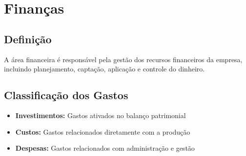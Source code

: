 \documentclass{article}
\begin{document}
\section{Finanças}

\subsection{Definição}
A área financeira é responsável pela gestão dos recursos financeiros da empresa, incluindo planejamento, captação, aplicação e controle do dinheiro.

\subsection{Classificação dos Gastos}
\begin{itemize}
    \item \textbf{Investimentos:} Gastos ativados no balanço patrimonial
    \item \textbf{Custos:} Gastos relacionados diretamente com a produção
    \item \textbf{Despesas:} Gastos relacionados com administração e gestão
\end{itemize}
\end{document}
